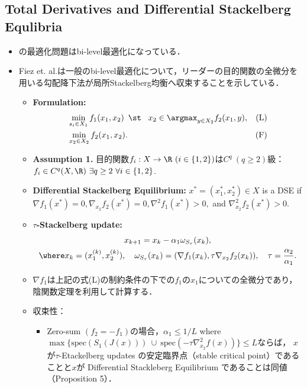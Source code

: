 \documentclass[a4paper,10pt,dvipdfmx]{jsarticle}
\begin{document}
\subsection{Total Derivatives and Differential Stackelberg Equlibria}

\begin{itemize}
    \item {}の最適化問題はbi-level最適化になっている．
    \item Fiez et. al.\cite{Fiez2020-lu}は一般のbi-level最適化について，リーダーの目的関数の全微分を用いる勾配降下法が局所Stackelberg均衡へ収束することを示している．
    \begin{itemize}
        \item {\bf Formulation:}
        \begin{align}
            &\min_{s_i\in X_1} f_1(x_1,x_2)\enspace\st\enspace\ x_2\in\argmax_{y\in X_2}f_2(x_1,y), &(\mathrm{L})\\
            &\min_{x_2\in X_2}f_2(x_1,x_2). &(\mathrm{F})
        \end{align}
        \item {\bf Assumption 1.} 目的関数$f_i:X\to\R~(i\in\{1,2\})$は$C^q~(q\ge 2)$級：$f_i\in C^q(X,\R)~\exists q\ge 2~\forall i\in\{1,2\}$.
        \item {\bf Differential Stackelberg Equilibrium:} $x^*=(x_1^*,x_2^*)\in X$ is a DSE if $\nabla f_1(x^*)=0, \nabla_{x_2}f_2(x^*)=0, \nabla^2f_1(x^*)>0,$ and $\nabla_{x_2}^2f_2(x^*)>0$.
        \item {\bf $\tau$-Stackelberg update:}
        \begin{gather}
            x_{k+1}=x_{k}-\alpha_1\omega_{S_{\tau}}(x_k),\\
            \where x_k=(x_1^{(k)},x_2^{(k)}),\quad\omega_{S_{\tau}}(x_k)=(\nabla f_1(x_k),\tau\nabla_{x_2}f_2(x_k)),\quad\tau =\dfrac{\alpha_2}{\alpha_1}.
        \end{gather}
        \item $\nabla f_1$は上記の式(L)の制約条件の下での$f_1$の$x_1$についての全微分であり，陰関数定理を利用して計算する．
        \item 収束性：
        \begin{itemize}
            \item[1.] Zero-sum $(f_2=-f_1)$の場合，$\alpha_1\le 1/L$ where $\max\{\mathrm{spec}(S_1(J(x)))~\cup~\mathrm{spec}(-\tau\nabla_{x_2}^2f(x))\}\le L$ならば， $x$が$\tau$-Etackelberg updates の安定臨界点（stable critical point）であることと$x$が Differential Stackleberg Equilibrium であることは同値（Proposition 5）．

\end{itemize}
\end{itemize}
\end{itemize}
\end{document}
